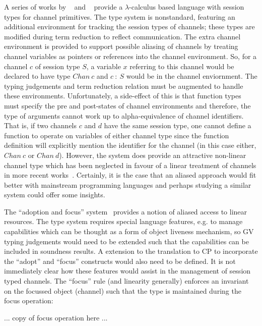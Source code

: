 \documentclass{mprop}
\newcommand{\1}{\textbf{1}\xspace}
\begin{document}
A series of works by \citeauthor{Gay:2003:STI}~\cite{Gay:2003:STI} and \citeauthor{Vasconcelos:2006:TCM}~\cite{Vasconcelos:2006:TCM} provide a $\lambda$-calculus based language with session types for channel primitives. The type system is nonstandard, featuring an additional environment for tracking the session types of channels; these types are modified during term reduction to reflect communication. The extra channel environment is provided to support possible aliasing of channels by treating channel variables as pointers or references into the channel environment. So, for a channel $c$ of session type $S$, a variable $x$ referring to this channel would be declared to have type $Chan~c$ and $c~:~S$ would be in the channel enviornment. The typing judgements and term reduction relation must be augmented to handle these environments. Unfortunately, a side-effect of this is that function types must specify the pre and post-states of channel environments and therefore, the type of arguments cannot work up to alpha-equivalence of channel identifiers. That is, if two channels $c$ and $d$ have the same session type, one cannot define a function to operate on variables of either channel type since the function definition will explicitly mention the identifier for the channel (in this case either, $Chan~c$ or $Chan~d$). However, the system does provide an attractive non-linear channel type which has been neglected in favour of a linear treatment of channels in more recent works~\cite{Gay:2010:LAST,Mazurak:2010:LCC,Wadler:2012}. Certainly, it is the case that an aliased approach would fit better with mainstream programming languages and perhaps studying a similar system could offer some insights.

The ``adoption and focus'' system~\cite{Fahndrich:2002} provides a notion of aliased access to linear resources. The type system requires special language features, e.g. to manage capabilities which can be thought as a form of object liveness mechanism, so GV typing judgements would need to be extended such that the capabilities can be included in soundness results. A extension to the translation to CP to incorporate the ``adopt'' and ``focus'' constructs would also need to be defined. It is not immediately clear how these features would assist in the management of session typed channels. The ``focus'' rule (and linearity generally) enforces an invariant on the focussed object (channel) such that the type is maintained during the focus operation:

... copy of focus operation here ...
\end{document}
